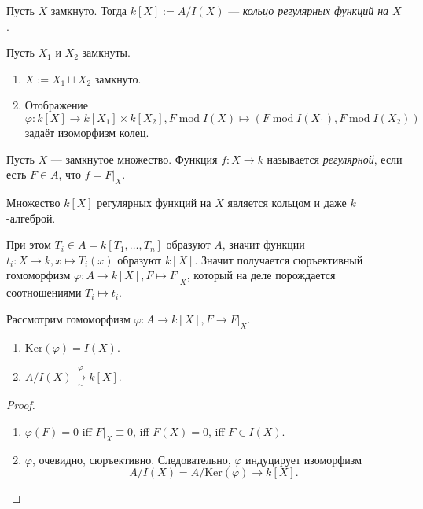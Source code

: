 \documentclass[12pt,a4paper]{article}
\renewcommand{\mod}{\mathrm{mod}}
\newcommand{\Ker}{\mathrm{Ker}}
\begin{document}
    \begin{definition}
        Пусть $X$ замкнуто. Тогда $k[X] := A/I(X)$ --- \emph{кольцо регулярных функций на $X$}.
    \end{definition}

    \begin{lemma}
        Пусть $X_1$ и $X_2$ замкнуты.
        \begin{enumerate}
            \item $X := X_1 \sqcup X_2$ замкнуто.
            \item Отображение
                \[\varphi: k[X] \to k[X_1] \times k[X_2], F \mathop{\mod} I(X) \mapsto (F \mathop{\mod} I(X_1), F \mathop{\mod} I(X_2))\]
                задаёт изоморфизм колец.
        \end{enumerate}
    \end{lemma}

    \begin{definition}
        Пусть $X$ --- замкнутое множество. Функция $f: X \to k$ называется \emph{регулярной}, если есть $F \in A$, что $f = F|_X$.
    \end{definition}

    \begin{remark}
        Множество $k[X]$ регулярных функций на $X$ является кольцом и даже $k$-алгеброй.
        
        При этом $T_i \in A = k[T_1, \dots, T_n]$ образуют $A$, значит функции $t_i: X \to k, x \mapsto T_i(x)$ образуют $k[X]$. Значит получается сюръективный гомоморфизм $\varphi: A \to k[X], F \mapsto F|_X$, который на деле порождается соотношениями $T_i \mapsto t_i$. 
    \end{remark}

    \begin{lemma}
        Рассмотрим гомоморфизм $\varphi: A \to k[X], F \to F|_X$.
        \begin{enumerate}
            \item $\Ker(\varphi) = I(X)$.
            \item $A/I(X) \underset{\sim}{\overset{\varphi}{\to}} k[X]$.
        \end{enumerate}
    \end{lemma}

    \begin{proof}
        \begin{enumerate}
            \item $\varphi(F) = 0$ iff $F|_{X} \equiv 0$, iff $F(X) = 0$, iff $F \in I(X)$.
            \item $\varphi$, очевидно, сюръективно. Следовательно, $\varphi$ индуцирует изоморфизм
                \[A/I(X) = A/\Ker(\varphi) \to k[X].\]
        \end{enumerate}
    \end{proof}
\end{document}
